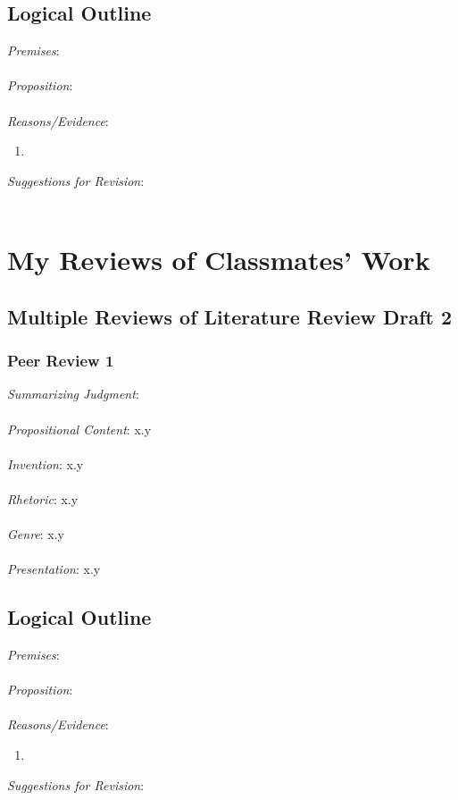 \documentclass[12pt]{article}
\begin{document}
\subsection*{Logical Outline}
\noindent \textit{Premises}: \\ \\
\textit{Proposition}: \\ \\
\textit{Reasons/Evidence}:
\begin{enumerate}
	\item \ %
\end{enumerate}
\textit{Suggestions for Revision}: \\\\
















\newpage

\section{My Reviews of Classmates' Work}
\subsection{Multiple Reviews of Literature Review Draft 2}
\subsubsection*{Peer Review 1}
\noindent \textit{Summarizing Judgment}: \\ \\
\textit{Propositional Content}: x.y \\ \\ %
\textit{Invention}: x.y \\ \\
\textit{Rhetoric}: x.y \\ \\
\textit{Genre}: x.y \\ \\
\textit{Presentation}: x.y
\subsection*{Logical Outline}
\noindent \textit{Premises}: \\ \\
\textit{Proposition}: \\ \\
\textit{Reasons/Evidence}:
\begin{enumerate}
	\item \ %
\end{enumerate}
\textit{Suggestions for Revision}: \\\\
\end{document}
